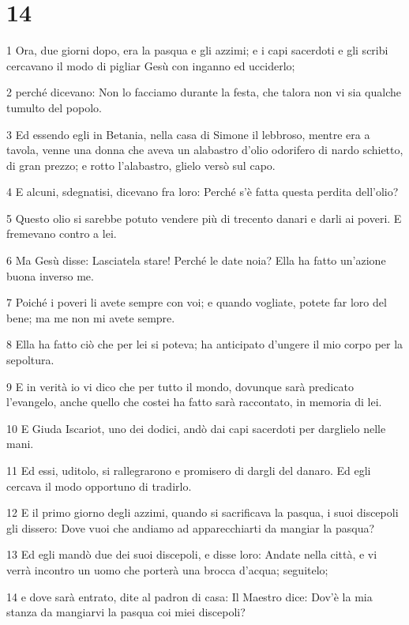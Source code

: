 \chapter{14}

\par 1 Ora, due giorni dopo, era la pasqua e gli azzimi; e i capi sacerdoti e gli scribi cercavano il modo di pigliar Gesù con inganno ed ucciderlo;
\par 2 perché dicevano: Non lo facciamo durante la festa, che talora non vi sia qualche tumulto del popolo.
\par 3 Ed essendo egli in Betania, nella casa di Simone il lebbroso, mentre era a tavola, venne una donna che aveva un alabastro d'olio odorifero di nardo schietto, di gran prezzo; e rotto l'alabastro, glielo versò sul capo.
\par 4 E alcuni, sdegnatisi, dicevano fra loro: Perché s'è fatta questa perdita dell'olio?
\par 5 Questo olio si sarebbe potuto vendere più di trecento danari e darli ai poveri. E fremevano contro a lei.
\par 6 Ma Gesù disse: Lasciatela stare! Perché le date noia? Ella ha fatto un'azione buona inverso me.
\par 7 Poiché i poveri li avete sempre con voi; e quando vogliate, potete far loro del bene; ma me non mi avete sempre.
\par 8 Ella ha fatto ciò che per lei si poteva; ha anticipato d'ungere il mio corpo per la sepoltura.
\par 9 E in verità io vi dico che per tutto il mondo, dovunque sarà predicato l'evangelo, anche quello che costei ha fatto sarà raccontato, in memoria di lei.
\par 10 E Giuda Iscariot, uno dei dodici, andò dai capi sacerdoti per darglielo nelle mani.
\par 11 Ed essi, uditolo, si rallegrarono e promisero di dargli del danaro. Ed egli cercava il modo opportuno di tradirlo.
\par 12 E il primo giorno degli azzimi, quando si sacrificava la pasqua, i suoi discepoli gli dissero: Dove vuoi che andiamo ad apparecchiarti da mangiar la pasqua?
\par 13 Ed egli mandò due dei suoi discepoli, e disse loro: Andate nella città, e vi verrà incontro un uomo che porterà una brocca d'acqua; seguitelo;
\par 14 e dove sarà entrato, dite al padron di casa: Il Maestro dice: Dov'è la mia stanza da mangiarvi la pasqua coi miei discepoli?
